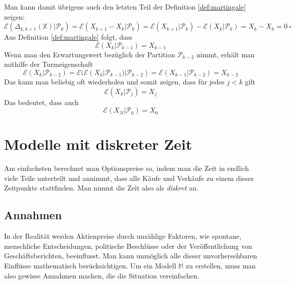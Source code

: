 \documentclass[11pt]{report} %
\begin{document}
Man kann damit übrigens auch den letzten Teil der Definition \ref{def:martingale} zeigen:
$$\mathcal{E}(\Delta_{k, k+1}(\mathbb{X})|\mathcal{P}_k)=\mathcal{E}(X_{k+1}-X_k|\mathcal{P}_k)=\mathcal{E}(X_{k+1}|\mathcal{P}_k)-\mathcal{E}(X_k|\mathcal{P}_k)=X_k-X_k=0\ \square$$
Aus Definition \ref{def:martingale} folgt, dass $$\mathcal{E}(X_k|\mathcal{P}_{k-1})=X_{k-1}$$
Wenn man den Erwartungswert bezüglich der Partition $\mathcal{P}_{k-2}$ nimmt, erhält man mithilfe der Turmeigenschaft $$\mathcal{E}(X_k|\mathcal{P}_{k-2})=\mathcal{E}(\mathcal{E}(X_k|\mathcal{P}_{k-1})|\mathcal{P}_{k-2})=\mathcal{E}(X_{k-1}|\mathcal{P}_{k-2})=X_{k-2}$$
Das kann man beliebig oft wiederholen und somit zeigen, dass für jedes $j<k$ gilt $$\mathcal{E}(X_k|\mathcal{P}_{j})=X_{j}$$ Das bedeutet, dass auch $$\mathcal{E}(X_N|\mathcal{P}_{0})=X_{0}$$

\section{Modelle mit diskreter Zeit}

Am einfachsten berechnet man Optionspreise so, indem man die Zeit in endlich viele Teile unterteilt und annimmt, dass alle Käufe und Verkäufe zu einem dieser Zeitpunkte stattfinden. Man nimmt die Zeit also als \textit{diskret} an.

\subsection{Annahmen}
In der Realität werden Aktienpreise durch unzählige Faktoren, wie spontane, menschliche Entscheidungen, politische Beschlüsse oder der Veröffentlichung von Geschäftsberichten, beeinflusst. Man kann unmöglich alle dieser unvorhersehbaren Einflüsse mathematisch berücksichtigen. Um ein Modell $\mathbb{M}$ zu erstellen, muss man also gewisse Annahmen machen, die die Situation vereinfachen.
\end{document}
